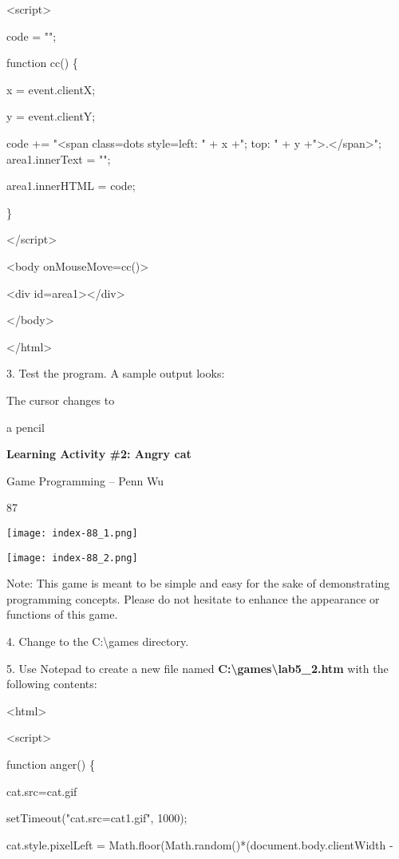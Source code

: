 \documentclass[
]{article}
\begin{document}
\textless script\textgreater{}

code = "";

function cc() \{

x = event.clientX;

y = event.clientY;

code += "\textless span class=dots style=\textquotesingle left: " + x
+"; top: " + y
+"\textquotesingle\textgreater.\textless/span\textgreater";
area1.innerText = "";

area1.innerHTML = code;

\}

\textless/script\textgreater{}

\textless body onMouseMove=cc()\textgreater{}

\textless div id=area1\textgreater\textless/div\textgreater{}

\textless/body\textgreater{}

\textless/html\textgreater{}

3. Test the program. A sample output looks:

The cursor changes to

a pencil

\textbf{Learning Activity \#2: Angry cat}

Game Programming -- Penn Wu

87

\protect\hypertarget{index_split_006.htmlux5cux23p88}{}{}\texttt{[image: index-88\_1.png]}

\texttt{[image: index-88\_2.png]}

Note: This game is meant to be simple and easy for the sake of
demonstrating programming concepts. Please do not hesitate to enhance
the appearance or functions of this game.

4. Change to the C:\textbackslash games directory.

5. Use Notepad to create a new file named
\textbf{C:\textbackslash games\textbackslash lab5\_2.htm} with the
following contents:

\textless html\textgreater{}

\textless script\textgreater{}

function anger() \{

cat.src=\textquotesingle cat.gif\textquotesingle{}

setTimeout("cat.src=\textquotesingle cat1.gif\textquotesingle", 1000);

cat.style.pixelLeft =
Math.floor(Math.random()*(document.body.clientWidth -
\end{document}
